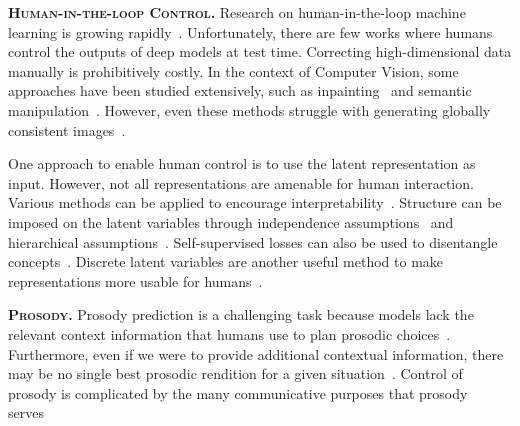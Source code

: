 \documentclass[a4paper,12pt,twoside,openright]{report}
\newcommand{\fzero}{F\textsubscript{0}}
\begin{document}
\textbf{\textsc{Human-in-the-loop Control}.} Research on human-in-the-loop machine learning is growing rapidly~\parencite{wu2022survey}.
Unfortunately, there are few works where humans control the outputs of deep models at test time. Correcting high-dimensional data manually is prohibitively costly. In the context of Computer Vision, some approaches have been studied extensively, such as inpainting~\parencite{Elharrouss2019ImageIA} and semantic manipulation~\parencite{park2019SPADE}. However, even these methods struggle with generating globally consistent images~\parencite{Zhang2023TowardsCI}.

One approach to enable human control is to use the latent representation as input. However, not all representations are amenable for human interaction. Various methods can be applied to encourage interpretability~\parencite{Tschannen2018RecentAI}. Structure can be imposed on the latent variables through independence assumptions~\parencite{prosody-control:VAE-MI:2021} and hierarchical assumptions~\parencite{Hsu2017UnsupervisedLO}. Self-supervised losses can also be used to disentangle concepts~\parencite{prosody-control:VAE-3dim:2020}. Discrete latent variables are another useful method to make representations more usable for humans~\parencite{VQ-VAE:2017}.


\textbf{\textsc{Prosody}.}
Prosody prediction is a challenging task because models lack the relevant context information that humans use to plan prosodic choices~\parencite{context-definition:1992}. Furthermore, even if we were to provide additional contextual information, there may be no single best prosodic rendition for a given situation~\parencite{zack-SSW19:2019}. Control of prosody is complicated by the many communicative purposes that prosody serves~\parencite{grounding:1991}
\end{document}
